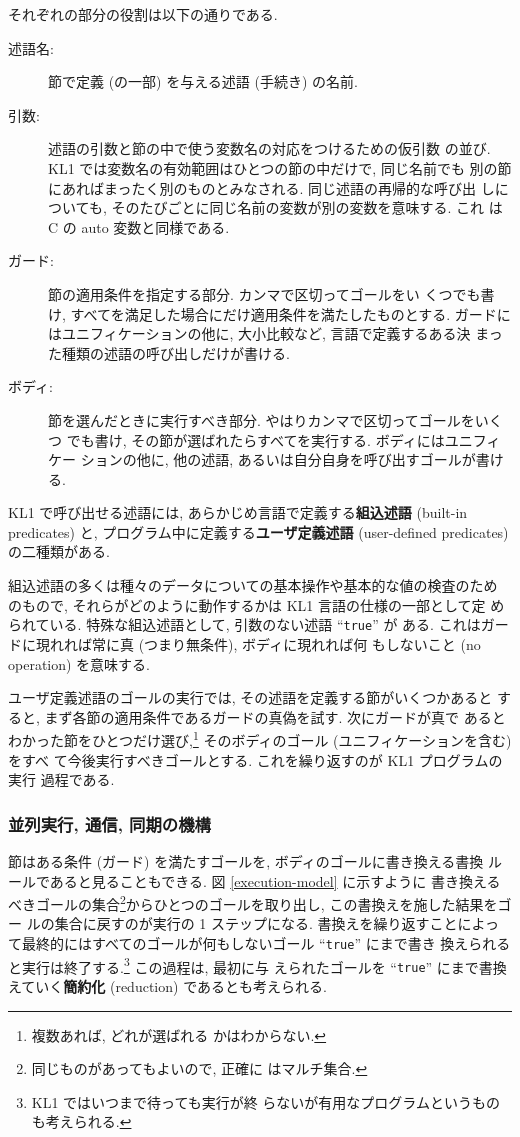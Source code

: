 \documentclass[a4,titlepage]{jsreport}
\def\em{\bf\dg}
\let\dg\bf
\begin{document}
それぞれの部分の役割は以下の通りである.
\begin{description}
\item[述語名:]
節で定義 (の一部) を与える述語 (手続き) の名前.
\item[引数:] 述語の引数と節の中で使う変数名の対応をつけるための仮引数
の並び.  KL1 では変数名の有効範囲はひとつの節の中だけで, 同じ名前でも
別の節にあればまったく別のものとみなされる.  同じ述語の再帰的な呼び出
しについても, そのたびごとに同じ名前の変数が別の変数を意味する.  これ
は C の auto 変数と同様である.
\item[ガード:] 節の適用条件を指定する部分.  カンマで区切ってゴールをい
くつでも書け, すべてを満足した場合にだけ適用条件を満たしたものとする.
ガードにはユニフィケーションの他に, 大小比較など, 言語で定義するある決
まった種類の述語の呼び出しだけが書ける.
\item[ボディ:]
節を選んだときに実行すべき部分.  やはりカンマで区切ってゴールをいくつ
でも書け, その節が選ばれたらすべてを実行する.  ボディにはユニフィケー
ションの他に, 他の述語, あるいは自分自身を呼び出すゴールが書ける.
\end{description}

KL1 で呼び出せる述語には, あらかじめ言語で定義する{\em 組込述語} 
(built-in predicates) と, プログラム中に定義する{\em ユーザ定義述語} 
(user-defined predicates) の二種類がある.

組込述語の多くは種々のデータについての基本操作や基本的な値の検査のため
のもので, それらがどのように動作するかは KL1 言語の仕様の一部として定
められている.  特殊な組込述語として, 引数のない述語 ``{\tt true}'' が
ある. これはガードに現れれば常に真 (つまり無条件), ボディに現れれば何
もしないこと (no operation) を意味する.

ユーザ定義述語のゴールの実行では, その述語を定義する節がいくつかあると
すると, まず各節の適用条件であるガードの真偽を試す.  次にガードが真で
あるとわかった節をひとつだけ選び,\footnote{複数あれば, どれが選ばれる
かはわからない.} そのボディのゴール (ユニフィケーションを含む) をすべ
て今後実行すべきゴールとする.  これを繰り返すのが KL1 プログラムの実行
過程である.

\subsubsection{並列実行, 通信, 同期の機構}
節はある条件 (ガード) を満たすゴールを, ボディのゴールに書き換える書換
ルールであると見ることもできる.  図 \ref{execution-model} に示すように
書き換えるべきゴールの集合\footnote{同じものがあってもよいので, 正確に
はマルチ集合.}からひとつのゴールを取り出し, この書換えを施した結果をゴー
ルの集合に戻すのが実行の 1 ステップになる.  書換えを繰り返すことによっ
て最終的にはすべてのゴールが何もしないゴール ``{\tt true}'' にまで書き
換えられると実行は終了する.\footnote{KL1 ではいつまで待っても実行が終
らないが有用なプログラムというものも考えられる.} この過程は, 最初に与
えられたゴールを ``{\tt true}'' にまで書換えていく{\em 簡約化}
(reduction) であるとも考えられる.
\end{document}
